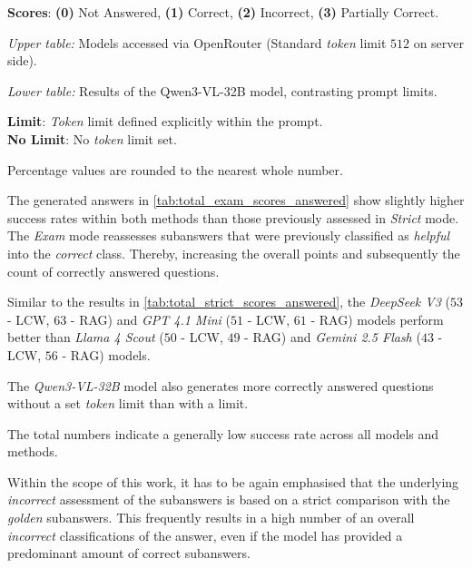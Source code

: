 \begin{table}[H]
\begin{threeparttable}
        \begin{tablenotes}\footnotesize
            \item \textbf{Scores}: \textbf{(0)} Not Answered, \textbf{(1)} Correct, \textbf{(2)} Incorrect, \textbf{(3)} Partially Correct.
            \item \textit{Upper table:} Models accessed via OpenRouter (Standard \textit{token} limit $512$ on server side).
            \item \textit{Lower table:} Results of the Qwen3-VL-32B model, contrasting prompt limits.
            \item \textbf{Limit}: \textit{Token} limit defined explicitly within the prompt.\\ \textbf{No Limit}: No \textit{token} limit set.
            \item Percentage values are rounded to the nearest whole number.
        \end{tablenotes}
    \end{threeparttable}
\end{table}

The generated answers in \cref{tab:total_exam_scores_answered} show slightly higher success rates within both methods than those previously assessed in \textit{Strict} mode.
The \textit{Exam} mode reassesses subanswers that were previously classified as \textit{helpful} into the \textit{correct} class.
Thereby, increasing the overall points and subsequently the count of correctly answered questions.

Similar to the results in \cref{tab:total_strict_scores_answered}, the \textit{DeepSeek V3} ($53$ - LCW, $63$ - RAG) and \textit{GPT 4.1 Mini} ($51$ - LCW, $61$ - RAG) models perform better than \textit{Llama 4 Scout} ($50$ - LCW, $49$ - RAG) and \textit{Gemini 2.5 Flash} ($43$ - LCW, $56$ - RAG) models.

The \textit{Qwen3-VL-32B} model also generates more correctly answered questions without a set \textit{token} limit than with a limit.

The total numbers indicate a generally low success rate across all models and methods.

Within the scope of this work, it has to be again emphasised that the underlying \textit{incorrect} assessment of the subanswers is based on a strict comparison with the \textit{golden} subanswers.
This frequently results in a high number of an overall \textit{incorrect} classifications of the answer, even if the model has provided a predominant amount of correct subanswers.


